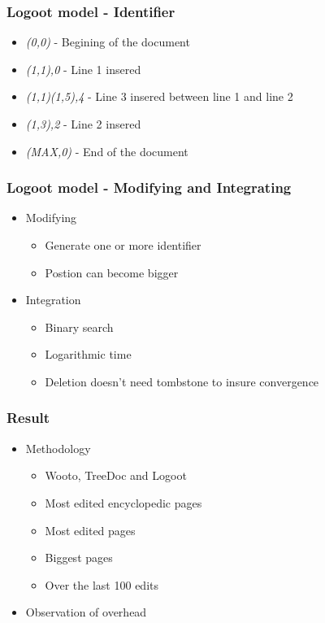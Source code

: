 \documentclass[14pt]{beamer}
\begin{document}
	\begin{frame}
		\frametitle{Logoot model - Identifier}
		\begin{itemize}
			\item<1-> \emph{(0,0)} - Begining of the document
			\item<2-> \emph{(1,1),0} - Line 1 insered
			\item<4-> \emph{(1,1)(1,5),4} - Line 3 insered between line 1 and line 2
			\item<3-> \emph{(1,3),2} - Line 2 insered
			\item<1-> \emph{(MAX,0)} - End of the document
		\end{itemize}		
	\end{frame}

	\begin{frame}
		\frametitle{Logoot model - Modifying and Integrating}
		\begin{itemize}
			\item Modifying
				\begin{itemize}
					\item Generate one or more identifier
					\item Postion can become bigger
				\end{itemize}
			\item Integration
				\begin{itemize}
					\item Binary search
					\item Logarithmic time
					\item Deletion doesn't need tombstone to insure convergence
				\end{itemize}		
		\end{itemize}
	\end{frame}

	\begin{frame}
		\frametitle{Result}
		\begin{itemize}
			\item Methodology
				\begin{itemize}
					\item Wooto, TreeDoc and Logoot
					\item Most edited encyclopedic pages
					\item Most edited pages
					\item Biggest pages
					\item Over the last 100 edits
				\end{itemize}
			\item Observation of overhead
		\end{itemize}
		
	\end{frame}
\end{document}
